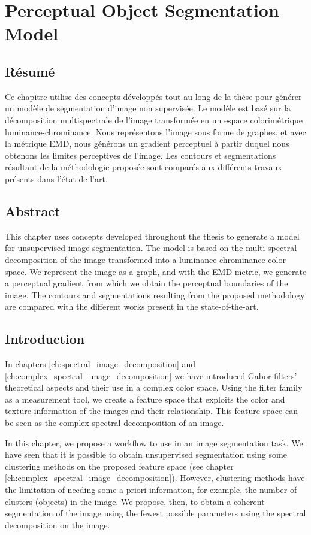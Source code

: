 
\chapter{Perceptual Object Segmentation Model} \label{ch:perceptual_object_boundaries_detection}

\section*{Résumé}
\noindent Ce chapitre utilise des concepts développés tout au long de la thèse pour générer un modèle de segmentation d'image non supervisée. Le modèle est basé sur la décomposition multispectrale de l'image transformée en un espace colorimétrique luminance-chrominance. Nous représentons l'image sous forme de graphes, et avec la métrique EMD, nous générons un gradient perceptuel à partir duquel nous obtenons les limites perceptives de l'image. Les contours et segmentations résultant de la méthodologie proposée sont comparés aux différents travaux présents dans l'état de l'art.
\section*{Abstract}
\noindent This chapter uses concepts developed throughout the thesis to generate a model for unsupervised image segmentation. The model is based on the multi-spectral decomposition of the image transformed into a luminance-chrominance color space. We represent the image as a graph, and with the EMD metric, we generate a perceptual gradient from which we obtain the perceptual boundaries of the image. The contours and segmentations resulting from the proposed methodology are compared with the different works present in the state-of-the-art. 

\section{Introduction}
In chapters \ref{ch:spectral_image_decomposition} and \ref{ch:complex_spectral_image_decomposition} we have introduced Gabor filters' theoretical aspects and their use in a complex color space. Using the filter family as a measurement tool, we create a feature space that exploits the color and texture information of the images and their relationship. This feature space can be seen as the complex spectral decomposition of an image.

In this chapter, we propose a workflow to use in an image segmentation task. We have seen that it is possible to obtain unsupervised segmentation using some clustering methods on the proposed feature space (see chapter \ref{ch:complex_spectral_image_decomposition}). However, clustering methods have the limitation of needing some a priori information, for example, the number of clusters (objects) in the image. We propose, then, to obtain a coherent segmentation of the image using the fewest possible parameters using the spectral decomposition on the image. 

